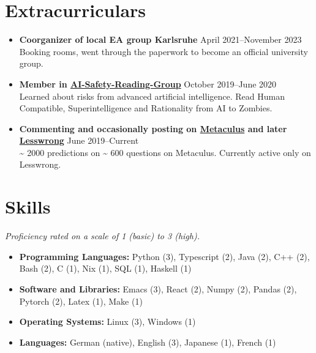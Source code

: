 \documentclass[letterpaper,10pt]{article}
\begin{document}
\ifdefined\EAVersion
\section*{Extracurriculars}
  \begin{itemize}
      \item {\textbf{Coorganizer of local EA group Karlsruhe}} \hfill April 2021--November 2023 \\
      {Booking rooms, went through the paperwork to become an official university group.}
      \item {\textbf{Member in \href{https://aisafety.com/}{AI-Safety-Reading-Group}}} \hfill October 2019--June 2020 \\
      {Learned about risks from advanced artificial intelligence. Read Human Compatible, Superintelligence and Rationality from AI to Zombies.}
      \item {\textbf{Commenting and occasionally posting on \href{https://www.metaculus.com/accounts/profile/106992/}{Metaculus} and later \href{https://www.lesswrong.com/users/morpheus}{Lesswrong}}} \hfill June 2019--Current \\
      {\textasciitilde{} 2000 predictions on \textasciitilde{} 600 questions on Metaculus. Currently active only on Lesswrong.}
  \end{itemize}
\fi

\unless\ifdefined\EAVersion
	\section*{Skills}
	\noindent\small\textit{Proficiency rated on a scale of 1 (basic) to 3 (high).}
	\normalsize
	\begin{itemize}
		\item \textbf{Programming Languages:} Python (3), Typescript (2), Java (2), C++ (2), Bash (2), C (1), Nix (1), SQL (1), Haskell (1)
		\item \textbf{Software and Libraries:} Emacs (3), React (2), Numpy (2), Pandas (2), Pytorch (2), Latex (1), Make (1)
		\item \textbf{Operating Systems:} Linux (3), Windows (1)
		\item \textbf{Languages:} German (native), English (3), Japanese (1), French (1)
	\end{itemize}
\fi
\end{document}
